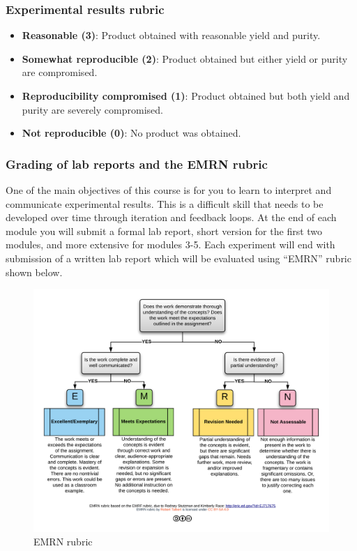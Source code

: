 \subsubsection{Experimental results
rubric}\label{experimental-results-rubric}

\begin{itemize}
\tightlist
\item
  \textbf{Reasonable (3)}: Product obtained with reasonable yield and
  purity.
\item
  \textbf{Somewhat reproducible (2)}: Product obtained but either yield
  or purity are compromised.
\item
  \textbf{Reproducibility compromised (1)}: Product obtained but both
  yield and purity are severely compromised.
\item
  \textbf{Not reproducible (0)}: No product was obtained.
\end{itemize}

\subsubsection{Grading of lab reports and the EMRN
rubric}\label{grading-of-lab-reports-and-the-emrn-rubric}

One of the main objectives of this course is for you to learn to
interpret and communicate experimental results. This is a difficult
skill that needs to be developed over time through iteration and
feedback loops. At the end of each module you will submit a formal lab
report, short version for the first two modules, and more extensive for
modules 3-5. Each experiment will end with submission of a written lab
report which will be evaluated using ``EMRN'' rubric shown below.

\begin{figure}
\centering
\includegraphics{EMRN-rubric-2020.png}
\caption{EMRN rubric}
\end{figure}

